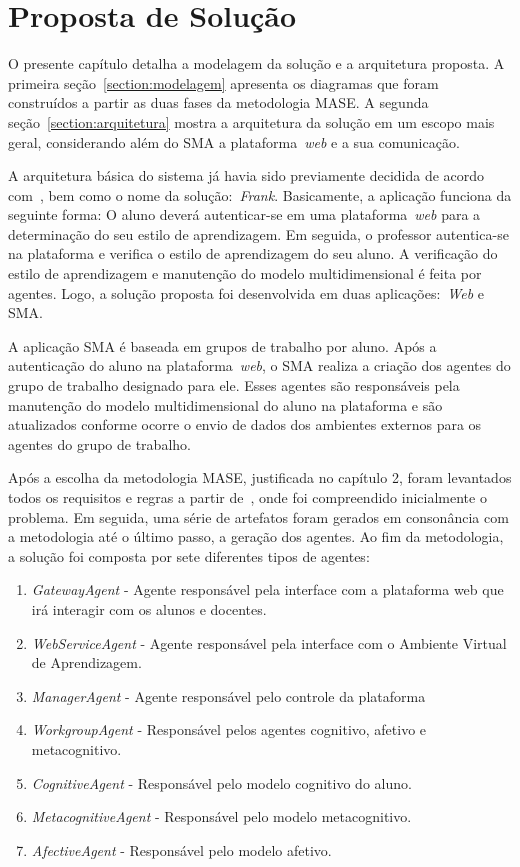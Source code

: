 \chapter{Proposta de Solução}

O presente capítulo detalha a modelagem da solução e a arquitetura proposta. A primeira seção~\ref{section:modelagem} apresenta os diagramas que foram construídos a partir as duas fases da metodologia MASE. A segunda seção~\ref{section:arquitetura} mostra a arquitetura da solução em um escopo mais geral, considerando além do SMA a plataforma~\emph{web} e a sua comunicação.

A arquitetura básica do sistema já havia sido previamente decidida de acordo com~\cite{editalFrank}, bem como o nome da solução:~\emph{Frank}. Basicamente, a aplicação funciona da seguinte forma: O aluno deverá autenticar-se em uma plataforma~\emph{web} para a determinação do seu estilo de aprendizagem. Em seguida, o professor autentica-se na plataforma e verifica o estilo de aprendizagem do seu aluno. A verificação do estilo de aprendizagem e manutenção do modelo multidimensional é feita por agentes. Logo, a solução proposta foi desenvolvida em duas aplicações:~\emph{Web} e SMA.

A aplicação SMA é baseada em grupos de trabalho por aluno. Após a autenticação do aluno na plataforma~\emph{web}, o SMA realiza a criação dos agentes do grupo de trabalho designado para ele. Esses agentes são responsáveis pela manutenção do modelo multidimensional do aluno na plataforma e são atualizados conforme ocorre o envio de dados dos ambientes externos para os agentes do grupo de trabalho.

Após a escolha da metodologia MASE, justificada no capítulo 2, foram levantados todos os requisitos e regras a partir de~\cite{editalFrank}, onde foi compreendido inicialmente o problema. Em seguida, uma série de artefatos foram gerados em consonância com a metodologia até o último passo, a geração dos agentes. Ao fim da metodologia, a solução foi composta por sete diferentes tipos de agentes:
\begin{enumerate}
	\item \emph{GatewayAgent} - Agente responsável pela interface com a plataforma web que irá interagir com os alunos e docentes.
	\item \emph{WebServiceAgent} - Agente responsável pela interface com o Ambiente Virtual de Aprendizagem.
	\item \emph{ManagerAgent} - Agente responsável pelo controle da plataforma
	\item \emph{WorkgroupAgent} - Responsável pelos agentes cognitivo, afetivo e metacognitivo.
	\item \emph{CognitiveAgent} - Responsável pelo modelo cognitivo do aluno.
	\item \emph{MetacognitiveAgent} - Responsável pelo modelo metacognitivo.
	\item \emph{AfectiveAgent} - Responsável pelo modelo afetivo.
\end{enumerate}

